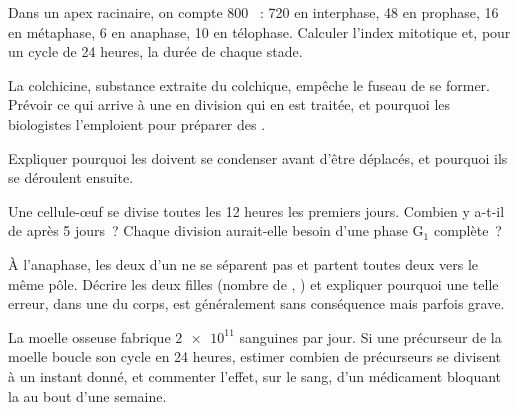\begin{exercise}[$\star\star$]\label{exo:g11:cell-cycle-mitosis:8}
Dans un apex racinaire, on compte 800 ~: 720 en interphase, 48
en prophase, 16 en métaphase, 6 en anaphase, 10 en télophase. Calculer
l'index mitotique et, pour un cycle de 24 heures, la durée de chaque
stade.
\end{exercise}

\begin{exercise}[$\star\star$]\label{exo:g11:cell-cycle-mitosis:9}
La colchicine, substance extraite du colchique, empêche le fuseau de se
former. Prévoir ce qui arrive à une  en division qui en est
traitée, et pourquoi les biologistes l'emploient pour préparer des
.
\end{exercise}

\begin{exercise}[$\star\star$]\label{exo:g11:cell-cycle-mitosis:10}
Expliquer pourquoi les  doivent se condenser avant d'être
déplacés, et pourquoi ils se déroulent ensuite.
\end{exercise}

\begin{exercise}[$\star\star$]\label{exo:g11:cell-cycle-mitosis:11}
Une cellule-œuf se divise toutes les 12 heures les premiers jours.
Combien y a-t-il de  après 5 jours~? Chaque division
aurait-elle besoin d'une phase $\mathrm{G_1}$ complète~?
\end{exercise}

\begin{exercise}[$\star\star\star$]\label{exo:g11:cell-cycle-mitosis:12}
À l'anaphase, les deux  d'un  ne se séparent pas
et partent toutes deux vers le même pôle. Décrire les deux 
filles (nombre de , ) et expliquer pourquoi une telle
erreur, dans une  du corps, est généralement sans conséquence
mais parfois grave.
\end{exercise}

\begin{exercise}[$\star\star\star$]\label{exo:g11:cell-cycle-mitosis:13}
La moelle osseuse fabrique $\num{2e11}$  sanguines par jour. Si
une  précurseur de la moelle boucle son cycle en 24 heures,
estimer combien de précurseurs se divisent à un instant donné, et
commenter l'effet, sur le sang, d'un médicament bloquant la  au
bout d'une semaine.
\end{exercise}

